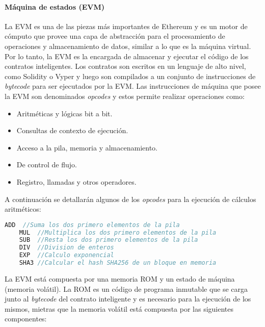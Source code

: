 \paragraph{Máquina de estados (EVM)}
\label{bc_ethereum_evm}

La EVM es una de las piezas más importantes de Ethereum y es un motor de cómputo que provee una capa de abstracción para el procesamiento de operaciones y almacenamiento de datos, similar a lo que es la máquina virtual. Por lo tanto, la EVM es la encargada de almacenar y ejecutar el código de los contratos inteligentes. Los contratos son escritos en un lenguaje de alto nivel, como Solidity o Vyper y luego son compilados a un conjunto de instrucciones de \textit{bytecode} para ser ejecutados por la EVM. Las instrucciones de máquina que posee la EVM son denominados \textit{opcodes} y estos permite realizar operaciones como:

\begin{itemize}
  \item Aritméticas y lógicas bit a bit.
  \item Consultas de contexto de ejecución.
  \item Acceso a la pila, memoria y almacenamiento.
  \item De control de flujo.
  \item Registro, llamadas y otros operadores.
\end{itemize}

A continuación se detallarán algunos de los \textit{opcodes} para la ejecución de cálculos aritméticos:

\begin{minipage}{\linewidth}
  \begin{lstlisting}[frame=single, language=javascript, captionpos=b, caption=Ejemplo de optcodes, belowskip=1em, aboveskip=2em, label={lst:post_archivo}]
    ADD  //Suma los dos primero elementos de la pila
    MUL  //Multiplica los dos primero elementos de la pila
    SUB  //Resta los dos primero elementos de la pila
    DIV  //Division de enteros
    EXP  //Calculo exponencial
    SHA3 //Calcular el hash SHA256 de un bloque en memoria
  \end{lstlisting}
\end{minipage}

La EVM está compuesta por una memoria ROM y un estado de máquina (memoria volátil). La ROM es un código de programa inmutable que se carga junto al \textit{bytecode} del contrato inteligente y es necesario para la ejecución de los mismos, mietras que la memoria volátil está compuesta por las siguientes componentes:

